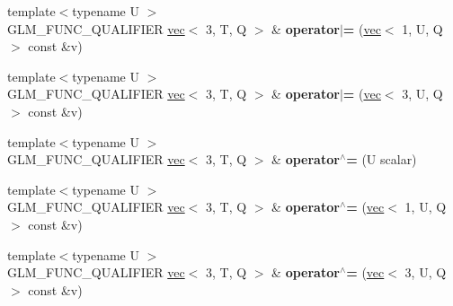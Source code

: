 \begin{DoxyCompactItemize}
\item 
\mbox{\label{structglm_1_1vec_3_013_00_01T_00_01Q_01_4_a989756f0f4b1dfb7c3b6e07f30cbd790}} 
{\footnotesize template$<$typename U $>$ }\\G\+L\+M\+\_\+\+F\+U\+N\+C\+\_\+\+Q\+U\+A\+L\+I\+F\+I\+ER \hyperlink{structglm_1_1vec}{vec}$<$ 3, T, Q $>$ \& {\bfseries operator$\vert$=} (\hyperlink{structglm_1_1vec}{vec}$<$ 1, U, Q $>$ const \&v)
\item 
\mbox{\label{structglm_1_1vec_3_013_00_01T_00_01Q_01_4_a7294cce332c6969861099356e29fbaa3}} 
{\footnotesize template$<$typename U $>$ }\\G\+L\+M\+\_\+\+F\+U\+N\+C\+\_\+\+Q\+U\+A\+L\+I\+F\+I\+ER \hyperlink{structglm_1_1vec}{vec}$<$ 3, T, Q $>$ \& {\bfseries operator$\vert$=} (\hyperlink{structglm_1_1vec}{vec}$<$ 3, U, Q $>$ const \&v)
\item 
\mbox{\label{structglm_1_1vec_3_013_00_01T_00_01Q_01_4_a81a4abd8c10a0585a35987317d6cb87f}} 
{\footnotesize template$<$typename U $>$ }\\G\+L\+M\+\_\+\+F\+U\+N\+C\+\_\+\+Q\+U\+A\+L\+I\+F\+I\+ER \hyperlink{structglm_1_1vec}{vec}$<$ 3, T, Q $>$ \& {\bfseries operator$^\wedge$=} (U scalar)
\item 
\mbox{\label{structglm_1_1vec_3_013_00_01T_00_01Q_01_4_af7af47fbde4d53045b59d69a7563eba7}} 
{\footnotesize template$<$typename U $>$ }\\G\+L\+M\+\_\+\+F\+U\+N\+C\+\_\+\+Q\+U\+A\+L\+I\+F\+I\+ER \hyperlink{structglm_1_1vec}{vec}$<$ 3, T, Q $>$ \& {\bfseries operator$^\wedge$=} (\hyperlink{structglm_1_1vec}{vec}$<$ 1, U, Q $>$ const \&v)
\item 
\mbox{\label{structglm_1_1vec_3_013_00_01T_00_01Q_01_4_abff32960a1defbf3301e8caa8c9fa1f6}} 
{\footnotesize template$<$typename U $>$ }\\G\+L\+M\+\_\+\+F\+U\+N\+C\+\_\+\+Q\+U\+A\+L\+I\+F\+I\+ER \hyperlink{structglm_1_1vec}{vec}$<$ 3, T, Q $>$ \& {\bfseries operator$^\wedge$=} (\hyperlink{structglm_1_1vec}{vec}$<$ 3, U, Q $>$ const \&v)
\item 
\mbox{\label{structglm_1_1vec_3_013_00_01T_00_01Q_01_4_a473a7e56a46f30b068af234b3babd712}} 

\end{DoxyCompactItemize}
